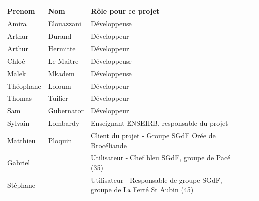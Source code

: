 \begin{table}[htbp]
    \centering
    \begin{tabular}{|l|l|l|p{4cm}|}
        \hline
        \textbf{Prenom} & \textbf{Nom} & \textbf{Rôle pour ce projet} \\
        \hline
        Amira & Elouazzani & Développeuse \\
        \hline
        Arthur & Durand & Développeur \\
        \hline
        Arthur & Hermitte & Développeur \\
        \hline
        Chloé & Le Maitre & Développeuse \\
        \hline
        Malek & Mkadem & Développeuse \\
        \hline
        Théophane & Loloum & Développeur \\
        \hline
        Thomas & Tuilier & Développeur \\
        \hline
        Sam & Gubernator & Développeur \\
        \hline
        Sylvain & Lombardy & Enseignant ENSEIRB, responsable du projet \\
        \hline
        Matthieu & Ploquin & Client du projet - Groupe SGdF Orée de Brocéliande \\
        \hline
        Gabriel & & Utilisateur - Chef bleu SGdF, groupe de Pacé (35) \\
        \hline
        Stéphane & & Utilisateur - Responsable de groupe SGdF, groupe de La Ferté St Aubin (45) \\
        \hline
    \end{tabular}
\end{table}

\newpage